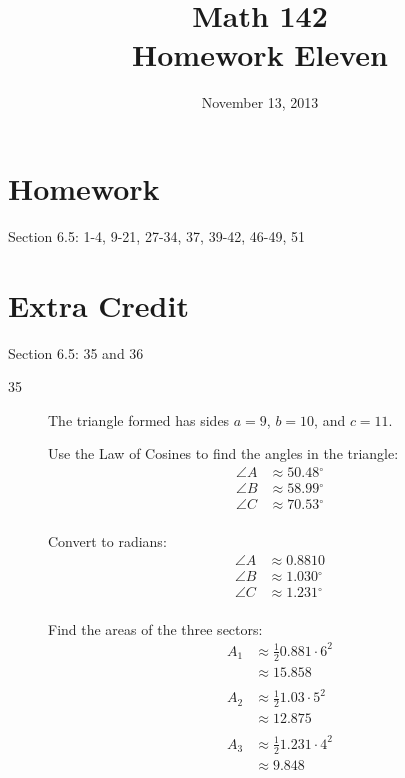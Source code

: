 \documentclass{exam}
\author{}
\date{November 13, 2013}
\title{Math 142 \\ Homework Eleven}
\newcommand{\dg}{\ensuremath{^\circ}}
\begin{document}
  \maketitle

  \section{Homework}
  Section 6.5: 1-4, 9-21, 27-34, 37, 39-42, 46-49, 51

  \section{Extra Credit}
  Section 6.5: 35 and 36

  \ifprintanswers
    \begin{description}
      \item[35]
        The triangle formed has sides $a = 9$, $b = 10$, and $c = 11$.

        Use the Law of Cosines to find the angles in the triangle:
        \begin{align*}
          \angle A & \approx 50.48 \dg \\
          \angle B & \approx 58.99 \dg \\
          \angle C & \approx 70.53 \dg \\
        \end{align*}

        Convert to radians:
        \begin{align*}
          \angle A & \approx 0.8810 \\
          \angle B & \approx 1.030 \dg \\
          \angle C & \approx 1.231 \dg \\
        \end{align*}

        Find the areas of the three sectors:
        \begin{align*}
          A_1 & \approx \frac{1}{2} 0.881 \cdot 6^2 \\
              & \approx 15.858 \\
          \\
          A_2 & \approx \frac{1}{2} 1.03 \cdot 5^2 \\
              & \approx 12.875 \\
          \\
          A_3 & \approx \frac{1}{2} 1.231 \cdot 4^2 \\
              & \approx 9.848 \\
        \end{align*}


\end{description}
\end{document}
